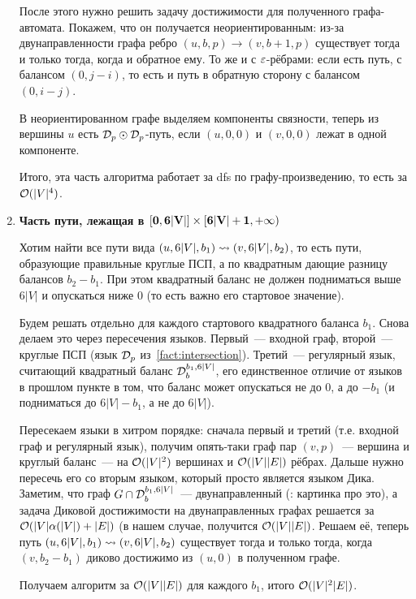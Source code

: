 \begin{enumerate}
    После этого нужно решить задачу достижимости для полученного графа-автомата. Покажем, что он получается неориентированным: из-за двунаправленности графа ребро $(u, b, p) \to (v, b+1, p)$ существует тогда и только тогда, когда и обратное ему. То же и с $\varepsilon$-рёбрами: если есть путь, с балансом $(0, j-i)$, то есть и путь в обратную сторону с балансом $(0, i-j)$.

    В неориентированном графе выделяем компоненты связности, теперь из вершины $u$ есть $\mathcal{D}_p \odot \mathcal{D}_p$-путь, если $(u, 0, 0)$ и $(v, 0, 0)$ лежат в одной компоненте.

    Итого, эта часть алгоритма работает за dfs по графу-произведению, то есть за $\mathcal{O}(|V|^4)$.

    \item {\bf Часть пути, лежащая в $\mathbf{[0, 6|V|] \times [6|V| + 1, +\infty)}$}

    Хотим найти все пути вида $(u, 6|V|, b_1) \rightsquigarrow (v, 6|V|, b_2)$, то есть пути, образующие правильные круглые ПСП, а по квадратным дающие разницу балансов $b_2 - b_1$. При этом квадратный баланс не должен подниматься выше $6|V|$ и опускаться ниже 0 (то есть важно его стартовое значение).

    Будем решать отдельно для каждого стартового квадратного баланса $b_1$. Снова делаем это через пересечения языков. Первый~--- входной граф, второй~--- круглые ПСП (язык $\mathcal{D}_p$ из~\ref{fact:intersection}). Третий~--- регулярный язык, считающий квадратный баланс $\mathcal{D}_b^{b_1, 6|V|}$, его единственное отличие от языков в прошлом пункте в том, что баланс может опускаться не до 0, а до $-b_1$ (и подниматься до $6|V| - b_1$, а не до $6|V|$).

    Пересекаем языки в хитром порядке: сначала первый и третий (т.е. входной граф и регулярный язык), получим опять-таки граф пар $(v, p)$~--- вершина и круглый баланс~--- на $\mathcal{O}(|V|^2)$ вершинах и $\mathcal{O}(|V||E|)$ рёбрах. Дальше нужно пересечь его со вторым языком, который просто является языком Дика. Заметим, что граф $G \cap \mathcal{D}_b^{b_1, 6|V|}$~--- двунаправленный (\TODO: картинка про это), а задача Диковой достижимости на двунаправленных графах решается за $\mathcal{O}(|V| \alpha(|V|) + |E|)$ (в нашем случае, получится $\mathcal{O}(|V||E|)$. Решаем её, теперь путь $(u, 6|V|, b_1) \rightsquigarrow (v, 6|V|, b_2)$ существует тогда и только тогда, когда $(v, b_2 - b_1)$ диково достижимо из $(u, 0)$ в полученном графе.

    Получаем алгоритм за $\mathcal{O}(|V||E|)$ для каждого $b_1$, итого $\mathcal{O}(|V|^2 |E|)$.

\end{enumerate}

